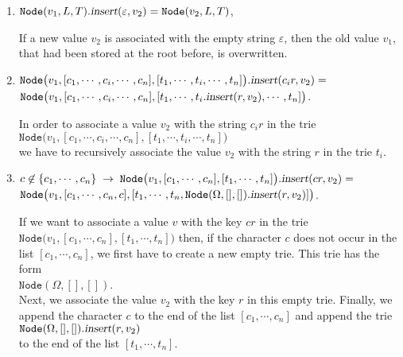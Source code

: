 \begin{enumerate}
\item $\texttt{Node}(v_1,L,T).\textsl{insert}(\varepsilon, v_2) = \texttt{Node}(v_2,L,T)$,
  
      If a new value $v_2$ is associated with the empty string $\varepsilon$, then the old value
      $v_1$, that had been stored at the root before, is overwritten.
\item $\texttt{Node}\bigl(v_1,[c_1,\cdots,c_i,\cdots,c_n], [t_1,\cdots,t_i,\cdots,t_n]\bigr).\textsl{insert}(c_ir,v_2) =$ \\[0.2cm]
      \hspace*{1.3cm}  
      $\texttt{Node}\bigl(v_1,[c_1,\cdots,c_i,\cdots,c_n], [t_1,\cdots,t_i.\textsl{insert}(r,v_2),\cdots,t_n]\bigr)$.

      In order to associate a value $v_2$ with the string $c_ir$ in the trie
      \\[0.2cm]
      \hspace*{1.3cm}
      $\texttt{Node}\bigl(v_1,[c_1,\cdots,c_i,\cdots,c_n], [t_1,\cdots,t_i,\cdots,t_n]\bigr)$ 
      \\[0.2cm]
      we have to recursively associate the value $v_2$ with the string $r$ in the trie $t_i$.
\item $c \not\in\{c_1,\cdots,c_n\} \;\rightarrow\;\texttt{Node}\bigl(v_1,[c_1,\cdots,c_n], [t_1,\cdots,t_n]\bigr).\textsl{insert}(cr,v_2) =$ \\[0.2cm]
      \hspace*{1.3cm}  
      $\texttt{Node}\bigl(v_1,[c_1,\cdots,c_n,c], [t_1,\cdots,t_n,\texttt{Node}(\Omega,[],[]).\textsl{insert}(r,v_2)]\bigr)$.
      
      If we want to associate a value $v$ with the key $cr$ in the trie
      $\texttt{Node}\bigl(v_1,[c_1,\cdots,c_n], [t_1,\cdots,t_n]\bigr)$ then, if the character $c$
      does not occur in the list $[c_1,\cdots,c_n]$, we first have to create a new empty trie.
      This trie has the form \\[0.2cm]
      \hspace*{1.3cm} $\texttt{Node}(\Omega, [], [])$. \\[0.2cm]
      Next, we associate the value $v_2$ with the key $r$ in this empty trie.  Finally,
      we append the character $c$ to the end of the list $[c_1,\cdots,c_n]$ and append the trie
        \\[0.2cm] 
      \hspace*{1.3cm}
      $\texttt{Node}(\Omega, [], []).\textsl{insert}(r,v_2)$ 
      \\[0.2cm]
      to the end of the list $[t_1,\cdots,t_n]$.
\end{enumerate}

